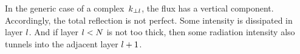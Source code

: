 In the generic case of a complex~$k_{\perp l}$,
the flux has a vertical component.
Accordingly, the total reflection is not perfect.
Some intensity is dissipated in layer $l$.
%
And if layer $l<N$ is not too thick,
then some radiation intensity also tunnels into the adjacent layer $l+1$.
%


% 
%
